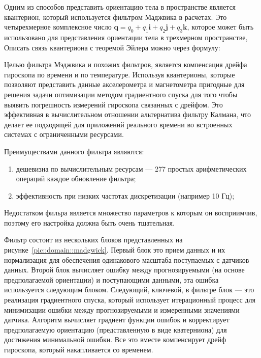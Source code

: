 Одним из способов представить ориентацию тела в пространстве является квантерион, который используется фильтром Маджвика в расчетах.
Это четырехмерное комплексное число $\mathbf{q}=q_{0}+q_{1}\mathbf{i}+q_{2}\mathbf{j}+q_{3}\mathbf{k}$, которое может быть использовано 
для представления ориентации тела в трехмерном пространстве,
Описать связь квантериона с теоремой Эйлера можно через формулу: 


Целью фильтра Мэджвика и похожих фильтров, является компенсация дрейфа гироскопа по времени и по температуре.
Используя квантерионы, которые позволяют представить данные акселерометра и магнетометра пригодные для решения задачи оптимизации 
методом градиентного спуска для того чтобы выявить погрешность измерений гироскопа связанных с дрейфом. Это эффективная в 
вычислительном отношении альтернатива фильтру Калмана, что делает ее подходящей для приложений реального времени во встроенных 
системах с ограниченными ресурсами. 

Преимуществами данного фильтра являются:

\begin{enumerate}
    \item дешевизна по вычислительным ресурсам — 277 простых арифметических операций каждое обновление фильтра;
    \item эффективность при низких частотах дискретизации (например 10 Гц);
\end{enumerate}

Недостатком фильра является множество параметров к которым он восприимчив, поэтому его настройка должна быть очень тщательная.

Фильтр состоит из нескольких блоков представленных на рисунке~\ref{pic::domain::madgwick}.
Первый блок это прием данных и их нормализация для обеспечения одинакового 
масштаба поступаемых с датчиков данных.
Второй блок вычисляет ошибку между прогнозируемыми (на основе предполагаемой ориентации) и поступающими данными, 
эта ошибка используется следующим блоком.
Следующий, ключевой, в фильтре блок --- это реализация градиентного спуска, который 
использует итерационный процесс для минимизации ошибки между прогнозируемыми и 
измеренными значениями датчика. Алгоритм вычисляет градиент функции ошибок и корректирует
предполагаемую ориентацию (представленную в виде кватерниона) для достижения минимальной ошибки.
Все это вместе компенсирует дрейф гироскопа, который накапливается со временем.

